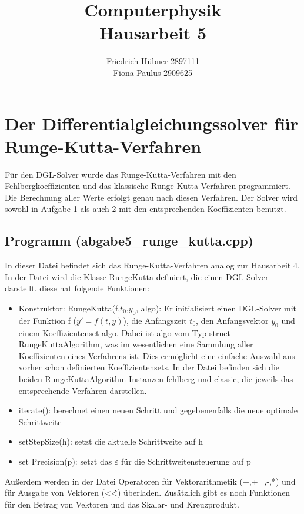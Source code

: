 \documentclass{scrreprt}
\author{Friedrich Hübner 2897111\\
Fiona Paulus 2909625}
\title{Computerphysik\\Hausarbeit 5}
\begin{document}
\maketitle
\newpage

\chapter*{Der Differentialgleichungssolver für Runge-Kutta-Verfahren}
Für den DGL-Solver wurde das Runge-Kutta-Verfahren mit den Fehlbergkoeffizienten und das klassische Runge-Kutta-Verfahren programmiert. Die Berechnung aller Werte erfolgt genau nach diesen Verfahren. Der Solver wird sowohl in Aufgabe 1 als auch 2 mit den entsprechenden Koeffizienten benutzt. 

\section*{Programm (abgabe5\_runge\_kutta.cpp)}
In dieser Datei befindet sich das Runge-Kutta-Verfahren analog zur Hausarbeit 4.\\

In der Datei wird die Klasse RungeKutta definiert, die einen DGL-Solver darstellt. diese hat folgende Funktionen:
\begin{itemize}
	\item Konstruktor: RungeKutta(f,$t_0$,$y_0$, algo): Er initialisiert einen DGL-Solver mit der Funktion f ($y' = f(t,y)$), die Anfangszeit $t_0$, den Anfangsvektor $y_0$ und einem Koeffizientenset algo. Dabei ist algo vom Typ struct RungeKuttaAlgorithm, was im wesentlichen eine Sammlung aller Koeffizienten eines Verfahrens ist. Dies ermöglicht eine einfache Auswahl aus vorher schon definierten Koeffizientensets. In der Datei befinden sich die beiden RungeKuttaAlgorithm-Instanzen fehlberg und classic, die jeweils das entsprechende Verfahren darstellen. 
	\item iterate(): berechnet einen neuen Schritt und gegebenenfalls die neue optimale Schrittweite
	\item setStepSize(h): setzt die aktuelle Schrittweite auf h
	\item set Precision(p): setzt das $\varepsilon$ für die Schrittweitensteuerung auf p
\end{itemize}

Außerdem werden in der Datei Operatoren für Vektorarithmetik (+,+=,-,*) und für Ausgabe von Vektoren (<\.<) überladen. Zusätzlich gibt es noch Funktionen für den Betrag von Vektoren und das Skalar- und Kreuzprodukt.  
\end{document}
